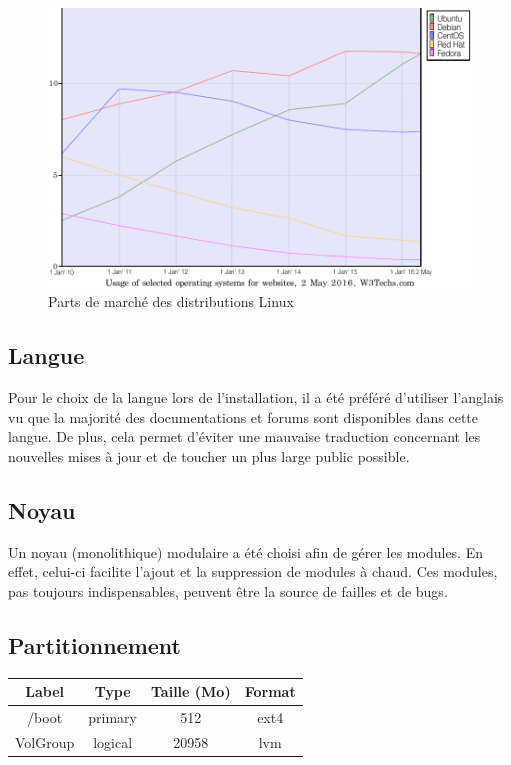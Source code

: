 \begin{figure}[h]
  \centering
  \includegraphics[scale=0.63]
  {textures/images/installation/distributions.pdf}
  \caption{Parts de marché des distributions Linux}
\end{figure}

\newpage

\subsection{Langue}
\label{sec:langue}

Pour le choix de la langue lors de l'installation, il a été préféré d'utiliser
l'anglais vu que la majorité des documentations et forums sont disponibles dans
cette langue. De plus, cela permet d'éviter une mauvaise traduction concernant
les nouvelles mises à jour et de toucher un plus large public possible.

\subsection{Noyau}
\label{sec:noyau}

Un noyau (monolithique) modulaire a été choisi afin de gérer les
modules. En effet, celui-ci facilite l'ajout et la suppression de modules à
chaud. Ces modules, pas toujours indispensables, peuvent être la source de
failles et de bugs.

\subsection{Partitionnement}
\label{sec:partitionnement}

\begin{center}
  \begin{tabularx}{\linewidth}{|C|C|C|C|}
    \hline
    Label & Type & Taille (Mo) & Format \\
    \hline
    \hline
    /boot & primary & 512 & ext4 \\
    \hline
    VolGroup & logical & 20958 & lvm \\
    \hline
  \end{tabularx}
\end{center}

